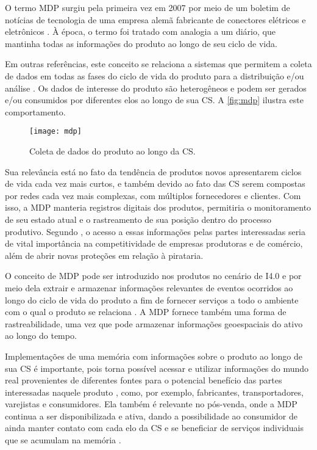 O termo MDP surgiu pela primeira vez em 2007 por meio de um boletim de notícias de tecnologia de uma empresa alemã fabricante de conectores elétricos e eletrônicos \cite{wahlster2007digitalmemory}. À época, o termo foi tratado com analogia a um diário, que mantinha todas as informações do produto ao longo de seu ciclo de vida.

Em outras referências, este conceito se relaciona a sistemas que permitem a coleta de dados em todas as fases do ciclo de vida do produto para a distribuição e/ou análise \cite{brandherm2011productmemory,blume2014mdp}. Os dados de interesse do produto são heterogêneos e podem ser gerados e/ou consumidos por diferentes elos ao longo de sua CS. A \autoref{fig:mdp} ilustra este comportamento.

\begin{figure}[htb]
	\centering
	\texttt{[image: mdp]}
	\caption{Coleta de dados do produto ao longo da CS.}
	\label{fig:mdp}
\end{figure}

Sua relevância está no fato da tendência de produtos novos apresentarem ciclos de vida cada vez mais curtos, e também devido ao fato das CS serem compostas por redes cada vez mais complexas, com múltiplos fornecedores e clientes. Com isso, a MDP manteria registros digitais dos produtos, permitiria o monitoramento de seu estado atual e o rastreamento de sua posição dentro do processo produtivo. Segundo , o acesso a essas informações pelas partes interessadas seria de vital importância na competitividade de empresas produtoras e de comércio, além de abrir novas proteções em relação à pirataria.

O conceito de MDP pode ser introduzido nos produtos no cenário de I4.0 e por meio dela extrair e armazenar informações relevantes de eventos ocorridos ao longo do ciclo de vida do produto a fim de fornecer serviços a todo o ambiente com o qual o produto se relaciona \cite{brandherm2011productmemory}. A MDP fornece também uma forma de rastreabilidade, uma vez que pode armazenar informações geoespaciais do ativo ao longo do tempo.

Implementações de uma memória com informações sobre o produto ao longo de sua CS é importante, pois torna possível acessar e utilizar informações do mundo real provenientes de diferentes fontes para o potencial benefício das partes interessadas naquele produto \cite{brandherm2011productmemory}, como, por exemplo, fabricantes, transportadores, varejistas e consumidores. Ela também é relevante no pós-venda, onde a MDP continua a ser disponibilizada e ativa, dando a possibilidade ao consumidor de ainda manter contato com cada elo da CS e se beneficiar de serviços individuais que se acumulam na memória \cite{brandherm2011productmemory}.

